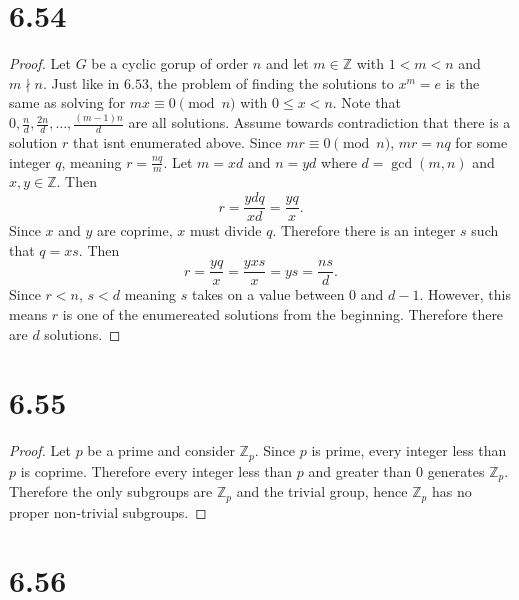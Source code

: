 \documentclass[12pt]{extarticle}
\begin{document}
\section*{6.54}
\begin{proof}
	Let $G$ be a cyclic gorup of order $n$ and let $m \in \mathbb{Z}$ with $1 < m < n$ and $m \nmid n$. Just like in $6.53$, the problem of finding the solutions to $x^m = e$ is the same as solving for $mx \equiv 0 \pmod{n}$ with $0 \leq x < n$. Note that $0, \frac{n}{d}, \frac{2n}{d}, \ldots, \frac{(m-1)n}{d}$ are all solutions. Assume towards contradiction that there is a solution $r$ that isnt enumerated above. Since $mr \equiv 0 \pmod{n}$, $mr = nq$ for some integer $q$, meaning $r = \frac{nq}{m}$. Let $m = xd$ and $n = yd$ where $d = \gcd(m,n)$ and $x,y \in \mathbb{Z}$. Then
	\[
		r = \frac{ydq}{xd} = \frac{yq}{x}
	.\]
	Since $x$ and $y$ are coprime, $x$ must divide $q$. Therefore there is an integer $s$ such that $q = xs$. Then
	\[
		r = \frac{yq}{x} = \frac{yxs}{x} = ys = \frac{ns}{d}
	.\]
	Since $r < n$, $s < d$ meaning $s$ takes on a value between $0$ and $d-1$. However, this means $r$ is one of the enumereated solutions from the beginning. Therefore there are $d$ solutions.
\end{proof}

\section*{6.55}
\begin{proof}
	Let $p$ be a prime and consider $\mathbb{Z}_p$. Since $p$ is prime, every integer less than $p$ is coprime. Therefore every integer less than $p$ and greater than $0$ generates $\mathbb{Z}_p$. Therefore the only subgroups are $\mathbb{Z}_p$ and the trivial group, hence $\mathbb{Z}_p$ has no proper non-trivial subgroups.
\end{proof}

\section*{6.56}
\end{document}
